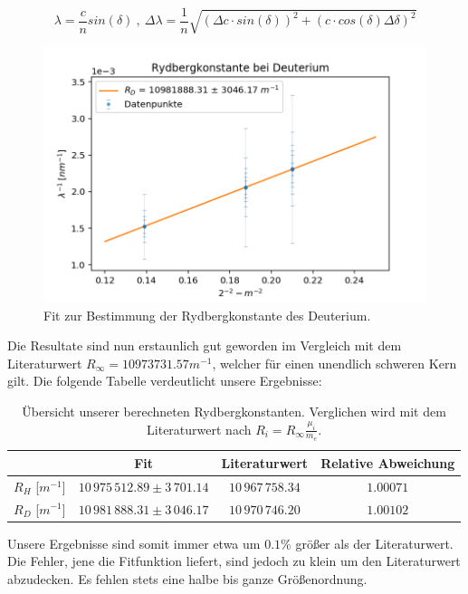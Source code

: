 \documentclass[]{article}
\begin{document}
\begin{equation}
\lambda = \frac{c}{n} sin(\delta) \:,\: \Delta\lambda = \frac{1}{n} \sqrt{(\Delta c \cdot sin(\delta))^2 + (c\cdot cos(\delta) \Delta\delta)^2}
\end{equation}

\begin{figure}[!h]
\centering
\includegraphics[width=1\textwidth]{Plots/R_D.png}
\caption{ Fit zur Bestimmung der Rydbergkonstante des Deuterium.}
\label{fig:Rydberg D}
\end{figure}

Die Resultate sind nun erstaunlich gut geworden im Vergleich mit dem Literaturwert $R_\infty = 10973731.57 m^{-1}$, welcher für einen unendlich schweren Kern gilt. Die folgende Tabelle verdeutlicht unsere Ergebnisse:

\begin{table}[!hbt]
	\centering
	\begin{tabular}{c|c|c|c}
		  & Fit & Literaturwert & Relative Abweichung  \\
		\hline
		$R_H$ [$m^{-1}$]& $10\,975\,512.89\pm 3\,701.14$ & $10\,967\,758.34$ & $1.00071$ \\
		\hline
		$R_D$ [$m^{-1}$]& $10\,981\,888.31\pm 3\,046.17$ & $10\,970\,746.20$ & $1.00102$ \\
	\end{tabular}
	\caption{Übersicht unserer berechneten Rydbergkonstanten. Verglichen wird mit dem Literaturwert nach $R_i = R_\infty \frac{\mu_i}{m_e}$.}
\end{table}

Unsere Ergebnisse sind somit immer etwa um $0.1\%$ größer als der Literaturwert. Die Fehler, jene die Fitfunktion liefert, sind jedoch zu klein um den Literaturwert abzudecken. Es fehlen stets eine halbe bis ganze Größenordnung.
\end{document}
